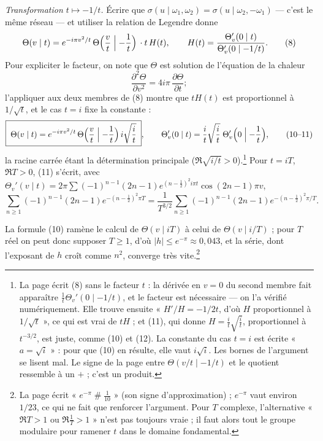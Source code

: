 \documentclass[11pt,a4paper]{article}
\begin{document}
\emph{Transformation $t \mapsto -1/t$.} Écrire que $\sigma(u \mid \omega_1,
\omega_2) = \sigma(u \mid \omega_2, -\omega_1)$ --- c'est le même réseau --- et
utiliser la relation de Legendre donne
\[
\Theta(v \mid t) = e^{-i\pi v^2/t}\,\Theta\Bigl(\frac vt \Bigm| -\frac1t\Bigr)\,
\cdot t\,H(t), \qquad H(t) = \frac{\Theta_v'(0 \mid t)}{\Theta_v'(0 \mid -1/t)} .
\tag{8}
\]
Pour expliciter le facteur, on note que $\Theta$ est solution de l'équation de
la chaleur
\[
\frac{\partial^2\Theta}{\partial v^2} = 4i\pi\,\frac{\partial\Theta}{\partial
t} ; \tag{9}
\]
l'appliquer aux deux membres de (8) montre que $tH(t)$ est proportionnel à
$1/\sqrt t$, et le cas $t = i$ fixe la constante :
\[
\boxed{\;\Theta(v \mid t) = e^{-i\pi v^2/t}\,\Theta\Bigl(\frac vt \Bigm|
-\frac1t\Bigr)\, i\sqrt{\frac it}\;}, \qquad
\Theta_v'(0 \mid t) = \frac it\sqrt{\frac it}\;\Theta_v'\Bigl(0 \Bigm|
-\frac1t\Bigr), \tag{10--11}
\]
la racine carrée étant la détermination principale ($\Re\sqrt{i/t} >
0$).\footnote{La page écrit (8) sans le facteur $t$ : la dérivée en $v = 0$ du
second membre fait apparaître $\frac1t\Theta_v'(0 \mid -1/t)$, et le facteur
est nécessaire --- on l'a vérifié numériquement. Elle trouve ensuite
« $H'/H = -1/2t$, d'où $H$ proportionnel à $1/\sqrt t$ », ce qui est vrai de
$tH$ ; et (11), qui donne $H = \frac it\sqrt{\frac it}$, proportionnel à
$t^{-3/2}$, est juste, comme (10) et (12). La constante du cas $t = i$ est
écrite « $a = \sqrt i$ » : pour que (10) en résulte, elle vaut $i\sqrt i$. Les
bornes de l'argument se lisent mal. Le signe de la page entre $\Theta(v/t \mid
-1/t)$ et le quotient ressemble à un $+$ ; c'est un produit.} Pour $t = iT$,
$\Re T > 0$, (11) s'écrit, avec $\Theta_v'(v \mid t) = 2\pi\sum(-1)^{n-1}(2n-1)
e^{(n - \frac12)^2 i\pi t}\cos(2n-1)\pi v$,
\[
\sum_{n \geqslant 1}(-1)^{n-1}(2n-1)e^{-(n-\frac12)^2\pi T} =
\frac{1}{T^{3/2}}\sum_{n \geqslant 1}(-1)^{n-1}(2n-1)e^{-(n-\frac12)^2\pi/T}. \tag{12}
\]

La formule (10) ramène le calcul de $\Theta(v \mid iT)$ à celui de $\Theta(v \mid
i/T)$ ; pour $T$ réel on peut donc supposer $T \geqslant 1$, d'où $|h| \leqslant
e^{-\pi} \approx 0{,}043$, et la série, dont l'exposant de $h$ croît comme $n^2$,
converge très vite.\footnote{La page écrit « $e^{-\pi} \mathbin{\#} \frac{1}{10}$
» (son signe d'approximation) ; $e^{-\pi}$ vaut environ $1/23$, ce qui ne fait
que renforcer l'argument. Pour $T$ complexe, l'alternative « $\Re T > 1$ ou
$\Re\frac1T > 1$ » n'est pas toujours vraie ; il faut alors tout le groupe
modulaire pour ramener $t$ dans le domaine fondamental.}
\end{document}
